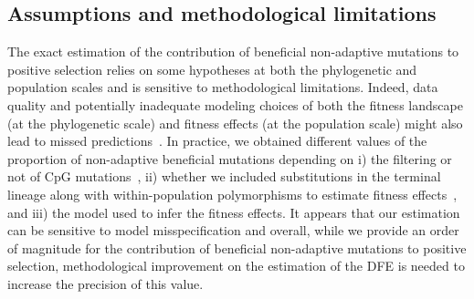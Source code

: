 \documentclass{article}
\begin{document}
    \subsection*{Assumptions and methodological limitations}

    The exact estimation of the contribution of beneficial non-adaptive mutations to positive selection relies on some hypotheses at both the phylogenetic and population scales and is sensitive to methodological limitations.
    Indeed, data quality and potentially inadequate modeling choices of both the fitness landscape (at the phylogenetic scale) and fitness effects (at the population scale) might also lead to missed predictions~\cite{moutinho_variation_2019}.
    In practice, we obtained different values of the proportion of non-adaptive beneficial mutations depending on i) the filtering or not of CpG mutations~\cite{eyre-walker_how_2014}, ii) whether we included substitutions in the terminal lineage along with within-population polymorphisms to estimate fitness effects~\cite{tataru_inference_2017}, and iii) the model used to infer the fitness effects.
    It appears that our estimation can be sensitive to model misspecification and overall, while we provide an order of magnitude for the contribution of beneficial non-adaptive mutations to positive selection, methodological improvement on the estimation of the DFE is needed to increase the precision of this value.
\end{document}
